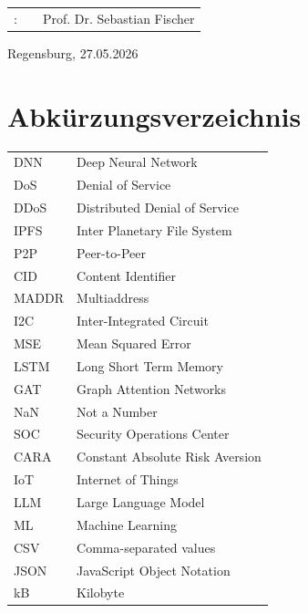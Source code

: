 \documentclass[]{thesisclass}
\newcommand{\reviewerone}{Prof. Dr. Sebastian Fischer}
\newcommand{\timeend}{Regensburg, \submissiontime}
\newcommand{\submissiontime}{27.05.2026}
\begin{document}
\begin{titlepage}
{\begin{center}
\begin{tabular}[ht]{l c l}
				\iflanguage{english}{Advisor}{Betreuer}: & \hfill  & \reviewerone\\
			
			\end{tabular}
		\end{center}
	}
	
	
	\vspace{1.8cm} %
	\begin{center}
		\timeend
	 \end{center}
	
	
\end{titlepage}

\tableofcontents
\newpage

\chapter*{Abkürzungsverzeichnis}
\begin{tabular}{ll}
	DNN       & Deep Neural Network \\
	DoS       & Denial of Service \\
	DDoS 	  & Distributed Denial of Service \\
	IPFS	  & Inter Planetary File System \\
	P2P	      & Peer-to-Peer \\
	CID	   	  & Content Identifier \\
	MADDR	  & Multiaddress \\
	I2C	      & Inter-Integrated Circuit \\
	MSE 	  & Mean Squared Error \\
	LSTM 	  & Long Short Term Memory \\
	GAT	 	  & Graph Attention Networks \\
	NaN	   	  & Not a Number \\
	SOC		  & Security Operations Center \\
	CARA 	  & Constant Absolute Risk Aversion \\
	IoT 	  & Internet of Things \\
	LLM 	  & Large Language Model \\
	ML 		  & Machine Learning \\
	CSV		  & Comma-separated values \\
	JSON	  & JavaScript Object Notation \\
	kB 		  & Kilobyte \\

\end{tabular}
\end{document}
